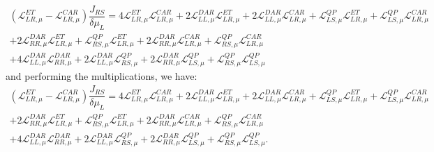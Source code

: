 \begin{multline*}
(\mathcal{L}_{LR,\mu}^{ET}-\mathcal{L}_{LR,\mu}^{CAR})\dfrac{J_{RS}}{\delta\mu_{L}}=
4\mathcal{L}_{LR,\mu}^{ET}\mathcal{L}_{LR,\mu}^{CAR}
+
2\mathcal{L}_{LL,\mu}^{DAR}\mathcal{L}_{LR,\mu}^{ET}+2\mathcal{L}_{LL,\mu}^{DAR}\mathcal{L}_{LR,\mu}^{CAR}
+
\mathcal{L}^{QP}_{LS,\mu}\mathcal{L}_{LR,\mu}^{ET}+\mathcal{L}^{QP}_{LS,\mu}\mathcal{L}_{LR,\mu}^{CAR}
\\+
2\mathcal{L}_{RR,\mu}^{DAR}\mathcal{L}_{LR,\mu}^{ET}+\mathcal{L}^{QP}_{RS,\mu}\mathcal{L}_{LR,\mu}^{ET}
+
2\mathcal{L}_{RR,\mu}^{DAR}\mathcal{L}_{LR,\mu}^{CAR}+\mathcal{L}^{QP}_{RS,\mu}\mathcal{L}_{LR,\mu}^{CAR}
\\+
4\mathcal{L}_{LL,\mu}^{DAR}\mathcal{L}_{RR,\mu}^{DAR}+2\mathcal{L}_{LL,\mu}^{DAR}\mathcal{L}^{QP}_{RS,\mu}
+
2\mathcal{L}_{RR,\mu}^{DAR}\mathcal{L}^{QP}_{LS,\mu}+\mathcal{L}^{QP}_{RS,\mu}\mathcal{L}^{QP}_{LS,\mu}
\end{multline*}
and performing the multiplications, we have:
\begin{multline*}
(\mathcal{L}_{LR,\mu}^{ET}-\mathcal{L}_{LR,\mu}^{CAR})\dfrac{J_{RS}}{\delta\mu_{L}}=
4\mathcal{L}_{LR,\mu}^{ET}\mathcal{L}_{LR,\mu}^{CAR}
+
2\mathcal{L}_{LL,\mu}^{DAR}\mathcal{L}_{LR,\mu}^{ET}
+
2\mathcal{L}_{LL,\mu}^{DAR}\mathcal{L}_{LR,\mu}^{CAR}
+
\mathcal{L}^{QP}_{LS,\mu}\mathcal{L}_{LR,\mu}^{ET}
+
\mathcal{L}^{QP}_{LS,\mu}\mathcal{L}_{LR,\mu}^{CAR}
\\+
2\mathcal{L}_{RR,\mu}^{DAR}\mathcal{L}_{LR,\mu}^{ET}
+
\mathcal{L}^{QP}_{RS,\mu}\mathcal{L}_{LR,\mu}^{ET}
+
2\mathcal{L}_{RR,\mu}^{DAR}\mathcal{L}_{LR,\mu}^{CAR}
+
\mathcal{L}^{QP}_{RS,\mu}\mathcal{L}_{LR,\mu}^{CAR}
\\+
4\mathcal{L}_{LL,\mu}^{DAR}\mathcal{L}_{RR,\mu}^{DAR}
+
2\mathcal{L}_{LL,\mu}^{DAR}\mathcal{L}^{QP}_{RS,\mu}
+
2\mathcal{L}_{RR,\mu}^{DAR}\mathcal{L}^{QP}_{LS,\mu}
+
\mathcal{L}^{QP}_{RS,\mu}\mathcal{L}^{QP}_{LS,\mu}.
\end{multline*}

